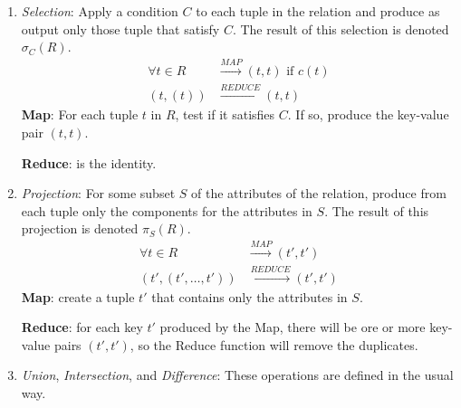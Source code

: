 \begin{enumerate}
    \item \textit{Selection}: Apply a condition $C$ to each tuple in the relation and produce as output only those tuple that satisfy $C$. The result of this selection is denoted $\sigma_C(R)$.
    \begin{equation*}
        \begin{split}
        \forall t\in R  & \xrightarrow{MAP} (t,t) \text{ if } c(t) \\
               (t, (t)) & \xrightarrow{REDUCE} (t,t) 
        \end{split}
    \end{equation*}
    \textbf{Map}: For each tuple $t$ in $R$, test if it satisfies $C$. If so, produce the key-value pair $(t, t)$.

    \textbf{Reduce}: is the identity.

    \item \textit{Projection}: For some subset $S$ of the attributes of the relation, produce from each tuple only the components for the attributes in $S$. The result of this projection is denoted $\pi_S(R)$. 
    \begin{equation*}
        \begin{split}
                  \forall t\in R & \xrightarrow{MAP} (t',t') \\
            (t', (t',\dots, t')) &\xrightarrow{REDUCE} (t',t')
        \end{split}
    \end{equation*}
    \textbf{Map}: create a tuple $t'$ that contains only the attributes in $S$.

    \textbf{Reduce}: for each key $t'$ produced by the Map, there will be ore or more key-value pairs $(t', t')$, so the Reduce function will remove the duplicates.

    \item \textit{Union}, \textit{Intersection}, and \textit{Difference}: These operations are defined in the usual way.  
    

\end{enumerate}
